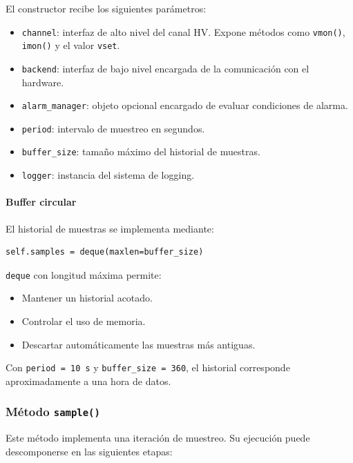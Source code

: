 \documentclass{article}
\begin{document}
El constructor recibe los siguientes parámetros:

\begin{itemize}
    \item \texttt{channel}: interfaz de alto nivel del canal HV. Expone métodos como \texttt{vmon()}, \texttt{imon()} y el valor \texttt{vset}.
    \item \texttt{backend}: interfaz de bajo nivel encargada de la comunicación con el hardware.
    \item \texttt{alarm\_manager}: objeto opcional encargado de evaluar condiciones de alarma.
    \item \texttt{period}: intervalo de muestreo en segundos.
    \item \texttt{buffer\_size}: tamaño máximo del historial de muestras.
    \item \texttt{logger}: instancia del sistema de logging.
\end{itemize}

\paragraph{Buffer circular}

El historial de muestras se implementa mediante:

\begin{lstlisting}
self.samples = deque(maxlen=buffer_size)
\end{lstlisting}

\texttt{deque} con longitud máxima permite:

\begin{itemize}
    \item Mantener un historial acotado.
    \item Controlar el uso de memoria.
    \item Descartar automáticamente las muestras más antiguas.
\end{itemize}

Con \texttt{period = 10 s} y \texttt{buffer\_size = 360}, el historial corresponde aproximadamente a una hora de datos.\\

\subsubsection{Método \texttt{sample()}}

Este método implementa una iteración de muestreo. Su ejecución puede descomponerse en las siguientes etapas:
\end{document}
